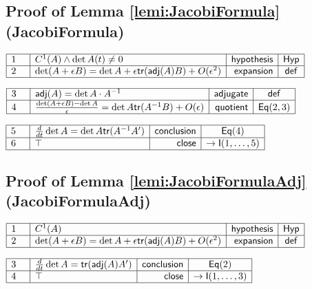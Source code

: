\documentclass[11pt,reqno]{amsart}
\begin{document}
	\subsection*{Proof of Lemma \protect\ref{lemi:JacobiFormula} (\textsf{JacobiFormula})}
	\noindent$\begin{array}{|m{0.5cm}|l|r|c|}
	\hline
	1 & C^{1}(A)\wedge\det A(t)\neq0 & \mathsf{hypothesis} & \mathsf{Hyp} \\ \hline
	2 & \det(A+\epsilon B)=\det A+\epsilon\mathsf{tr}(\mathsf{adj}(A)B)+O(\epsilon^{2}) & \mathsf{expansion} & \mathsf{def} \\ \hline
	\end{array}$
	\par\nointerlineskip\noindent$\begin{array}{|m{0.5cm}|l|r|c|}
	\hline
	3 & \mathsf{adj}(A)=\det A\cdot A^{-1} & \mathsf{adjugate} & \mathsf{def} \\ \hline
	4 & \frac{\det(A+\epsilon B)-\det A}{\epsilon}=\det A\mathsf{tr}(A^{-1}B)+O(\epsilon) & \mathsf{quotient} & \mathsf{Eq}(2,3) \\ \hline
	\end{array}$
	\par\nointerlineskip\noindent$\begin{array}{|m{0.5cm}|l|r|c|}
	\hline
	5 & \tfrac{d}{dt}\det A=\det A\mathsf{tr}(A^{-1}A^{\prime}) & \mathsf{conclusion} & \mathsf{Eq}(4) \\ \hline
	6 & \top & \mathsf{close} & \to\mathsf{I}(1,\dots,5) \\ \hline
	\end{array}$
	\medskip
	
	\subsection*{Proof of Lemma \protect\ref{lemi:JacobiFormulaAdj} (\textsf{JacobiFormulaAdj})}
	\noindent$\begin{array}{|m{0.5cm}|l|r|c|}
	\hline
	1 & C^{1}(A) & \mathsf{hypothesis} & \mathsf{Hyp} \\ \hline
	2 & \det(A+\epsilon B)=\det A+\epsilon\mathsf{tr}(\mathsf{adj}(A)B)+O(\epsilon^{2}) & \mathsf{expansion} & \mathsf{def} \\ \hline
	\end{array}$
	\par\nointerlineskip\noindent$\begin{array}{|m{0.5cm}|l|r|c|}
	\hline
	3 & \tfrac{d}{dt}\det A=\mathsf{tr}(\mathsf{adj}(A)A^{\prime}) & \mathsf{conclusion} & \mathsf{Eq}(2) \\ \hline
	4 & \top & \mathsf{close} & \to\mathsf{I}(1,\dots,3) \\ \hline
	\end{array}$
	\medskip
	
\end{document}
